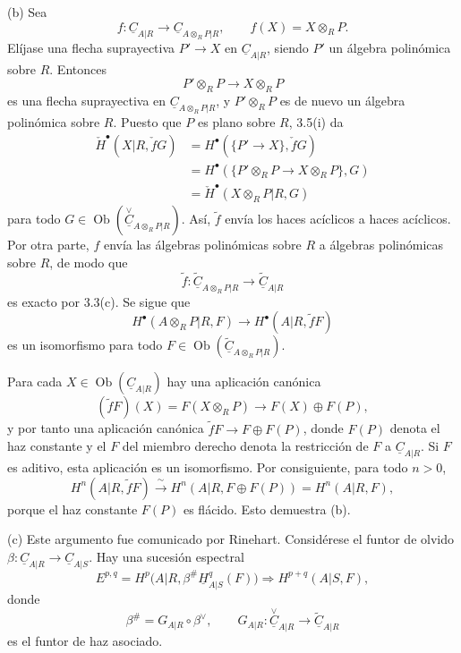 (b) Sea
\[
 f:\underline C_{A|R}\longrightarrow
 \underline C_{A\otimes_RP|R},
 \qquad f(X)=X\otimes_RP.
\]
Elíjase una flecha suprayectiva $P'\longrightarrow X$ en
$\underline C_{A|R}$, siendo $P'$ un álgebra polinómica sobre $R$.
Entonces
\[
 P'\otimes_RP\longrightarrow X\otimes_RP
\]
es una flecha suprayectiva en $\underline C_{A\otimes_RP|R}$, y
$P'\otimes_RP$ es de nuevo un álgebra polinómica sobre $R$. Puesto que
$P$ es plano
sobre $R$, 3.5(i) da
\begin{align*}
 \check H^{\bullet}(X|R,\check fG)
 &=H^{\bullet}(\{P'\longrightarrow X\},\check fG)\\
 &=H^{\bullet}(\{P'\otimes_RP\longrightarrow X\otimes_RP\},G)\\
 &=\check H^{\bullet}(X\otimes_RP|R,G)
\end{align*}
para todo
$G\in\operatorname{Ob}(\overset{\vee}{\underline C}_{A\otimes_RP|R})$.
Así, $\widetilde f$ envía los haces acíclicos a haces acíclicos. Por otra
parte, $f$ envía las álgebras polinómicas sobre $R$ a álgebras
polinómicas sobre $R$, de modo que
\[
 \widetilde f:\widetilde{\underline C}_{A\otimes_RP|R}
 \longrightarrow\widetilde{\underline C}_{A|R}
\]
es exacto por 3.3(c). Se sigue que
\[
 H^{\bullet}(A\otimes_RP|R,F)
 \longrightarrow H^{\bullet}(A|R,\widetilde fF)
\]
es un isomorfismo para todo
$F\in\operatorname{Ob}(\widetilde{\underline C}_{A\otimes_RP|R})$.

Para cada $X\in\operatorname{Ob}(\underline C_{A|R})$ hay una aplicación
canónica
\[
 (\widetilde fF)(X)=F(X\otimes_RP)
 \longrightarrow F(X)\oplus F(P),
\]
y por tanto una aplicación canónica
$\widetilde fF\longrightarrow F\oplus F(P)$, donde $F(P)$ denota el haz
constante y el $F$ del miembro derecho denota la restricción de $F$ a
$\underline C_{A|R}$. Si $F$ es aditivo, esta aplicación es un
isomorfismo. Por consiguiente, para todo $n>0$,
\[
 H^n(A|R,\widetilde fF)
 \xrightarrow{\ \sim\ }
 H^n(A|R,F\oplus F(P))=H^n(A|R,F),
\]
porque el haz constante $F(P)$ es flácido. Esto demuestra (b).


(c) Este argumento fue comunicado por Rinehart. Considérese el funtor de
olvido
$\beta:\underline C_{A|R}\longrightarrow\underline C_{A|S}$.
Hay una sucesión espectral
\[
 E^{p,q}=H^p\bigl(A|R,
 \beta^{\#}\underline H^q_{A|S}(F)\bigr)
 \Longrightarrow H^{p+q}(A|S,F),
\]
donde
\[
 \beta^{\#}=G_{A|R}\circ\beta^{\vee},
 \qquad
 G_{A|R}:\overset{\vee}{\underline C}_{A|R}
 \longrightarrow\widetilde{\underline C}_{A|R}
\]
es el funtor de haz asociado.

